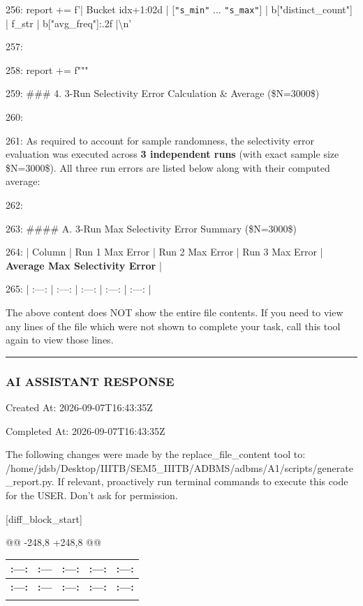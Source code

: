 \documentclass[11pt,a4paper]{article}
\begin{document}
256:         report += f'| Bucket {idx+1:02d} | [\texttt{"{s\_min}"} ... \texttt{"{s\_max}"}] | {b["distinct\_count"]} | {f\_str} | {b["avg\_freq"]:.2f} |\textbackslash{}n'

257:

258:     report += f"""

259: \#\#\# 4. 3-Run Selectivity Error Calculation \& Average (\$N=3000\$)

260:

261: As required to account for sample randomness, the selectivity error evaluation was executed across \textbf{3 independent runs} (with exact sample size \$N=3000\$). All three run errors are listed below along with their computed average:

262:

263: \#\#\#\# A. 3-Run Max Selectivity Error Summary (\$N=3000\$)

264: | Column | Run 1 Max Error | Run 2 Max Error | Run 3 Max Error | \textbf{Average Max Selectivity Error} |

265: | :---: | :---: | :---: | :---: | :---: |

The above content does NOT show the entire file contents. If you need to view any lines of the file which were not shown to complete your task, call this tool again to view those lines.


\hrule

\subsubsection{AI ASSISTANT RESPONSE}

Created At: 2026-09-07T16:43:35Z

Completed At: 2026-09-07T16:43:35Z

The following changes were made by the replace\_file\_content tool to: /home/jdsb/Desktop/IIITB/SEM5\_IIITB/ADBMS/adbms/A1/scripts/generate\_report.py. If relevant, proactively run terminal commands to execute this code for the USER. Don't ask for permission.

[diff\_block\_start]

@@ -248,8 +248,8 @@

{\begingroup
\small
\setlength{\tabcolsep}{4pt}
\begin{xltabular}{\textwidth}{C | C | C | C | C}
\toprule
\textbf{:---:} & \textbf{:---} & \textbf{:---:} & \textbf{:---:} & \textbf{:---:} \\
\midrule
\endfirsthead
\toprule
\textbf{:---:} & \textbf{:---} & \textbf{:---:} & \textbf{:---:} & \textbf{:---:} \\
\midrule
\endfirsthead
\endhead
\bottomrule
\endfoot
\bottomrule
\endlastfoot
\end{xltabular}
\endgroup}
\end{document}
